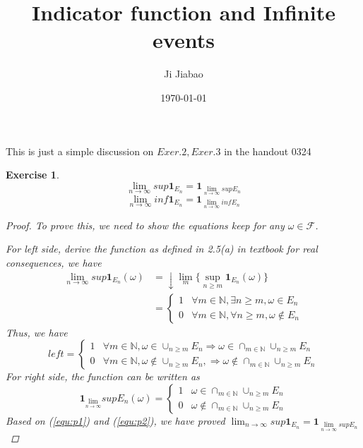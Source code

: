 \documentclass{article}
\title{Indicator function and Infinite events}
\author{Ji Jiabao}
\date{\today}
\newtheorem{exercise}[theorem]{Exercise}
\begin{document}
\maketitle

This is just a simple discussion on $Exer.2, Exer.3$ in the handout 0324
\begin{exercise} 
    $$\lim_{n \to \infty}sup\textbf{1}_{E_n} = \textbf{1}_{\lim \limits_{n\rightarrow \infty} sup E_n}$$
    $$\lim_{n \rightarrow \infty}inf\textbf{1}_{E_n} = \textbf{1}_{\lim \limits_{n\rightarrow \infty} inf E_n}$$
    
\begin{proof}
    
    To prove this, we need to show the equations keep for any $\omega \in \mathcal{F}$.

    For left side, derive the function as defined in 2.5(a) in textbook for real consequences, we have
    \begin{equation*}
        \begin{aligned}
            \lim \limits_{n \to \infty}sup \textbf{1}_{E_n}(\omega) & =   
                \downarrow \lim\limits_{m}\{ \mathop{sup}\limits_{n \geq m} {\textbf{1}_{E_n}(\omega)}\} \\
            & =
            \left\{
                \begin{array}{ll}
                1 & \forall m \in \mathbb{N}, \exists n \ge m, \omega \in E_n \\ 
                0 & \forall m \in \mathbb{N}, \forall n \ge m, \omega \notin E_n
                \end{array}
            \right.    
        \end{aligned}
    \end{equation*}
    Thus, we have 
    \begin{equation}
        left = \label{equ:p1}
        \left\{
            \begin{array}{ll}
            1 & \forall m \in \mathbb{N}, \omega \in \cup_{n \ge m} E_n \Rightarrow \omega \in \cap_{m \in \mathbb{N}} \cup_{n \geq m} E_{n}\\ 
            0 & \forall m \in \mathbb{N}, \omega \notin \cup_{n \ge m} E_n, \Rightarrow \omega \notin \cap_{m \in \mathbb{N}} \cup_{n \geq m} E_{n}
            \end{array}
        \right.    
    \end{equation}
    For right side, the function can be written as
    \begin{equation} 
        \textbf{1}_{\lim \limits_{n\rightarrow \infty}} sup E_n( \omega) = \label{equ:p2}
        \left\{
            \begin{array}{ll}
            1 & \omega \in \cap_{m \in \mathbb{N}} \cup_{n \geq m} E_{n} \\
            0 & \omega \notin \cap_{m \in \mathbb{N}} \cup_{n \geq m} E_{n}
            \end{array}
        \right.    
    \end{equation}
    Based on (\ref{equ:p1}) and (\ref{equ:p2}), we have proved $\lim_{n \to \infty}sup\textbf{1}_{E_n} = \textbf{1}_{\lim \limits_{n\rightarrow \infty} sup E_n}$
    

\end{proof}
\end{exercise}
\end{document}
